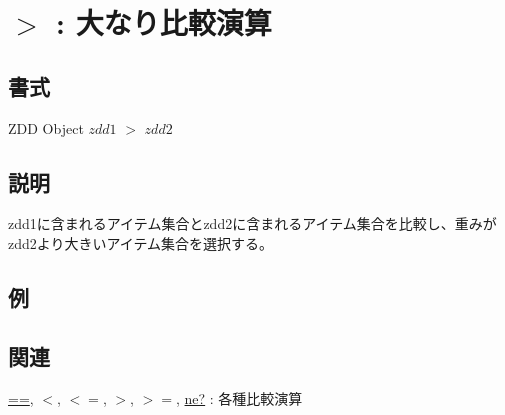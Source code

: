 
\section{$>$ : 大なり比較演算\label{sect:gt}}
\subsection*{書式}
ZDD Object  $zdd1$ $>$ $zdd2$

\subsection*{説明}
zdd1に含まれるアイテム集合とzdd2に含まれるアイテム集合を比較し、重みがzdd2より大きいアイテム集合を選択する。


\subsection*{例}


\subsection*{関連}
\hyperref[sect:eq]{==},
\hyperref[sect:lt]{$<$},
\hyperref[sect:le]{$<=$},
\hyperref[sect:gt]{$>$},
\hyperref[sect:ge]{$>=$},
\hyperref[sect:ne]{ne?} : 各種比較演算

